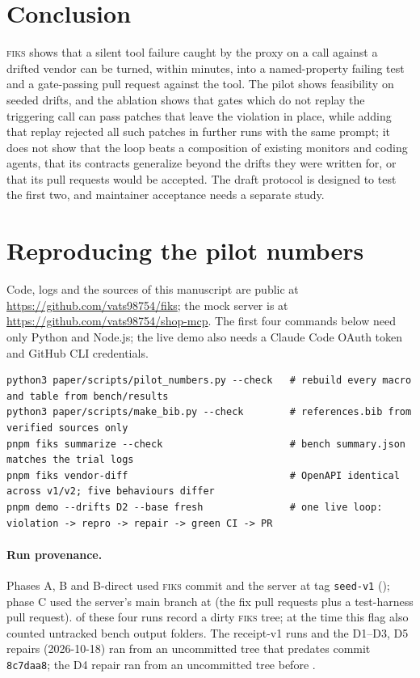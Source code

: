 \documentclass[10pt]{article}
\newcommand{\fiks}{\textsc{fiks}}
\begin{document}
\section{Conclusion}
\fiks{} shows that a silent tool failure caught by the proxy on a call against a drifted vendor can be turned, within minutes, into a named-property failing test and a gate-passing pull request against the tool. The pilot shows feasibility on seeded drifts, and the ablation shows that gates which do not replay the triggering call can pass patches that leave the violation in place, while adding that replay rejected all \expGatesFailLiveFailAlertplus{} such patches in \expRunsAlertplus{} further runs with the same prompt; it does not show that the loop beats a composition of existing monitors and coding agents, that its contracts generalize beyond the drifts they were written for, or that its pull requests would be accepted. The draft protocol is designed to test the first two, and maintainer acceptance needs a separate study.




\appendix
\section{Reproducing the pilot numbers}
\label{app:repro}
Code, logs and the sources of this manuscript are public at \url{https://github.com/vats98754/fiks}; the mock server is at \url{https://github.com/vats98754/shop-mcp}. The first four commands below need only Python and Node.js; the live demo also needs a Claude Code OAuth token and GitHub CLI credentials.

\begin{lstlisting}
python3 paper/scripts/pilot_numbers.py --check   # rebuild every macro and table from bench/results
python3 paper/scripts/make_bib.py --check        # references.bib from verified sources only
pnpm fiks summarize --check                      # bench summary.json matches the trial logs
pnpm fiks vendor-diff                            # OpenAPI identical across v1/v2; five behaviours differ
pnpm demo --drifts D2 --base fresh               # one live loop: violation -> repro -> repair -> green CI -> PR
\end{lstlisting}
\paragraph{Run provenance.} Phases A, B and B-direct used \fiks{} commit \texttt{\fiksSha} and the server at tag \texttt{seed-v1} (\texttt{\shopShaAB}); phase C used the server's main branch at \texttt{\shopShaC} (the \nPrsMerged{} fix pull requests plus a test-harness pull request). \nDirtyRuns{} of these four runs record a dirty \fiks{} tree; at the time this flag also counted untracked bench output folders. The receipt-v1 runs and the D1--D3, D5 repairs (2026-10-18) ran from an uncommitted tree that predates commit \texttt{8c7daa8}; the D4 repair ran from an uncommitted tree before \texttt{\fiksSha}.
\end{document}
